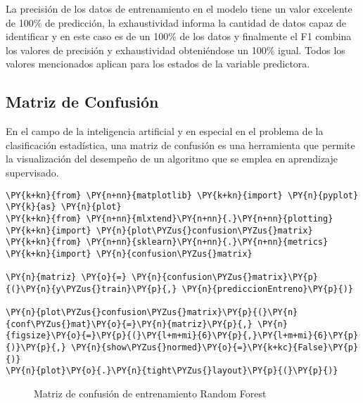     La precisión de los datos de entrenamiento en el modelo tiene un valor
excelente de 100\% de predicción, la exhaustividad informa la cantidad
de datos capaz de identificar y en este caso es de un 100\% de los datos
y finalmente el F1 combina los valores de precisión y exhaustividad
obteniéndose un 100\% igual. Todos los valores mencionados aplican para
los estados de la variable predictora.

    \hypertarget{matriz-de-confusiuxf3n}{%
\subsection{Matriz de Confusión}\label{matriz-de-confusiuxf3n}}

En el campo de la inteligencia artificial y en especial en el problema
de la clasificación estadística, una matriz de confusión es una
herramienta que permite la visualización del desempeño de un algoritmo
que se emplea en aprendizaje supervisado.

    \begin{tcolorbox}[breakable, size=fbox, boxrule=1pt, pad at break*=1mm,colback=cellbackground, colframe=cellborder]
\begin{Verbatim}[commandchars=\\\{\}]
\PY{k+kn}{from} \PY{n+nn}{matplotlib} \PY{k+kn}{import} \PY{n}{pyplot} \PY{k}{as} \PY{n}{plot}
\PY{k+kn}{from} \PY{n+nn}{mlxtend}\PY{n+nn}{.}\PY{n+nn}{plotting} \PY{k+kn}{import} \PY{n}{plot\PYZus{}confusion\PYZus{}matrix}
\PY{k+kn}{from} \PY{n+nn}{sklearn}\PY{n+nn}{.}\PY{n+nn}{metrics} \PY{k+kn}{import} \PY{n}{confusion\PYZus{}matrix}

\PY{n}{matriz} \PY{o}{=} \PY{n}{confusion\PYZus{}matrix}\PY{p}{(}\PY{n}{y\PYZus{}train}\PY{p}{,} \PY{n}{prediccionEntreno}\PY{p}{)}

\PY{n}{plot\PYZus{}confusion\PYZus{}matrix}\PY{p}{(}\PY{n}{conf\PYZus{}mat}\PY{o}{=}\PY{n}{matriz}\PY{p}{,} \PY{n}{figsize}\PY{o}{=}\PY{p}{(}\PY{l+m+mi}{6}\PY{p}{,}\PY{l+m+mi}{6}\PY{p}{)}\PY{p}{,} \PY{n}{show\PYZus{}normed}\PY{o}{=}\PY{k+kc}{False}\PY{p}{)}
\PY{n}{plot}\PY{o}{.}\PY{n}{tight\PYZus{}layout}\PY{p}{(}\PY{p}{)}
\end{Verbatim}
\end{tcolorbox}

\begin{center}
    	\begin{figure}[htb]
	\centering
	\caption{Matriz de confusión de entrenamiento Random Forest}
	\label{fig:mcerf}
	\end{figure}
\end{center}
    
